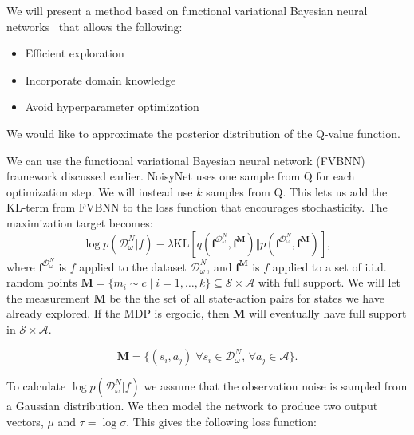 \documentclass[]{uai2021} %
\newcommand{\D}{\mathcal{D}}
\newcommand{\f}{\mathbf{f}}
\newcommand{\state}{\mathcal{S}}
\newcommand{\action}{\mathcal{A}}
\newcommand{\KL}{\mathrm{KL}}
\begin{document}
We will present a method based on functional variational Bayesian neural
networks~\citep{sun_functional_2019} that allows the following:

\begin{itemize}
    \item Efficient exploration
    \item Incorporate domain knowledge
    \item Avoid hyperparameter optimization
\end{itemize}

We would like to approximate the posterior distribution of the Q-value function.


We can use the functional variational Bayesian neural
network (FVBNN)~\citep{sun_functional_2019} framework discussed earlier.
NoisyNet uses one sample from Q for each optimization step. We will instead use
\(k\) samples from Q. This lets us add the KL-term from FVBNN to the loss function that
encourages stochasticity.
The maximization target becomes:
\begin{equation}
    \log p(\D_\omega^N \vert f) - \lambda \KL \left[ q(\f^{\D_\omega^N}, \f^\mathbf{M}) \Vert p(\f^{\D_\omega^N}, \f^\mathbf{M}) \right],
\end{equation}
where \(\f^{\D_\omega^N}\) is \(f\) applied to the dataset \(\D_\omega^N\), and \(\f^\mathbf{M}\) is \(f\) applied to
a set of i.i.d. random points \(\mathbf{M} = \{m_i \sim c \mid i=1,\dots,k\} \subseteq \state \times \action\)
with full support. We will let the measurement \(\mathbf{M}\) be the the set of all state-action
pairs for states we have already explored. If the MDP is ergodic, then \(\textbf{M}\) will eventually
have full support in \(\state \times \action\).

\begin{equation}
    \mathbf{M} = \{(s_i, a_j) \; \forall s_i \in \D_\omega^N,\, \forall a_j \in \action\}. 
\end{equation}

To calculate \(\log p(\D_\omega^N \vert f)\) we assume that the observation noise is sampled
from a Gaussian distribution. We then model the network to produce two output vectors,
\(\mu\) and \(\tau = \log \sigma\). This gives the following loss function:
\end{document}
